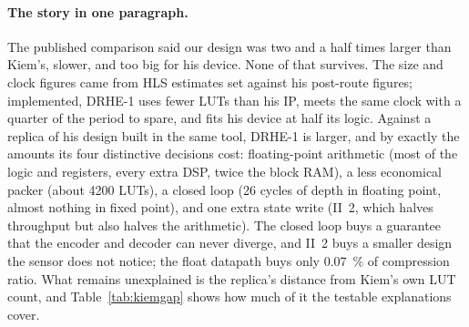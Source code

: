 \paragraph{The story in one paragraph.} The published comparison said our
design was two and a half times larger than Kiem's, slower, and too big for his
device. None of that survives. The size and clock figures came from HLS
estimates set against his post-route figures; implemented, DRHE-1 uses fewer
LUTs than his IP, meets the same clock with a quarter of the period to spare, and
fits his device at half its logic. Against a replica of his design built in the
same tool, DRHE-1 is larger, and by exactly the amounts its four distinctive
decisions cost: floating-point arithmetic (most of the logic and registers,
every extra DSP, twice the block RAM), a less economical packer (about
\num{4200} LUTs), a closed loop (26 cycles of depth in floating point, almost
nothing in fixed point), and one extra state write (II~2, which halves
throughput but also halves the arithmetic). The closed loop buys a guarantee
that the encoder and decoder can never diverge, and II~2 buys a smaller design
the sensor does not notice; the float datapath buys only \SI{0.07}{\percent} of
compression ratio. What remains unexplained is the
replica's distance from Kiem's own LUT count, and Table~\ref{tab:kiemgap}
shows how much of it the testable explanations cover.
